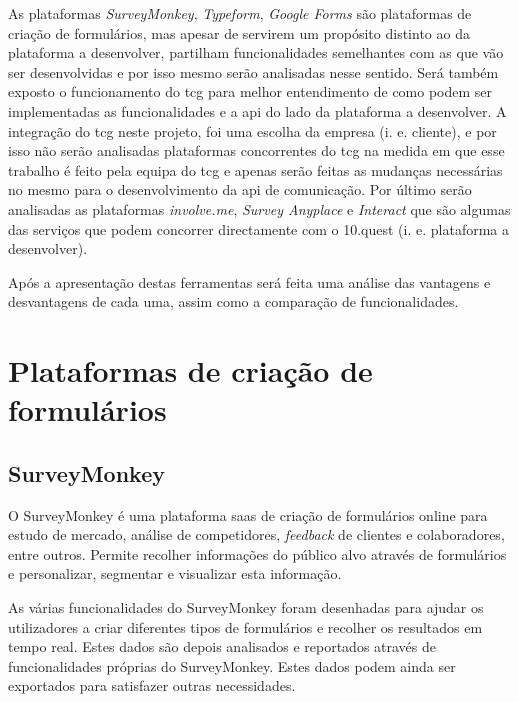 As plataformas \textit{SurveyMonkey}\cite{surveymonkey}, \textit{Typeform}\cite{typeform}, \textit{Google Forms}\cite{googleform} são plataformas de criação de formulários, mas apesar de servirem um propósito distinto ao da plataforma a desenvolver, partilham funcionalidades semelhantes com as que vão ser desenvolvidas e por isso mesmo serão analisadas nesse sentido. Será também exposto o funcionamento do \acrshort{tcg} para melhor entendimento de como podem ser implementadas as funcionalidades e a \acrshort{api} do lado da plataforma a desenvolver. A integração do \acrshort{tcg} neste projeto, foi uma escolha da empresa (i. e. cliente), e por isso não serão analisadas plataformas concorrentes do \acrshort{tcg} na medida em que esse trabalho é feito pela equipa do \acrshort{tcg} e apenas serão feitas as mudanças necessárias no mesmo para o desenvolvimento da \acrshort{api} de comunicação. Por último serão analisadas as plataformas \textit{involve.me}\cite{involve}, \textit{Survey Anyplace}\cite{surveyA} e \textit{Interact}\cite{interact} que são algumas das serviços que podem concorrer directamente com o 10.quest (i. e. plataforma a desenvolver).

Após a apresentação destas ferramentas será feita uma análise das vantagens e desvantagens de cada uma, assim como a comparação de funcionalidades.

\section{Plataformas de criação de formulários}
\label{formulários}

\subsection{SurveyMonkey}
\label{surveyMonkeyM}

O SurveyMonkey é uma plataforma \acrfull{saas} de criação de formulários online para estudo de mercado, análise de competidores, \textit{feedback} de clientes e colaboradores, entre outros. Permite recolher informações do público alvo através de formulários e personalizar, segmentar e visualizar esta informação.

As várias funcionalidades do SurveyMonkey foram desenhadas para ajudar os utilizadores a criar diferentes tipos de formulários e recolher os resultados em tempo real. Estes dados são depois analisados e reportados através de funcionalidades próprias do SurveyMonkey. Estes dados podem ainda ser exportados para satisfazer outras necessidades. 

